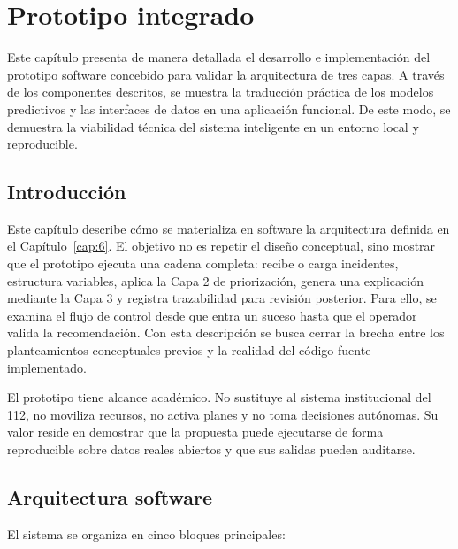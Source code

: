 \chapter{Prototipo integrado}
\label{cap:8}

Este capítulo presenta de manera detallada el desarrollo e implementación del prototipo software concebido para validar la arquitectura de tres capas. A través de los componentes descritos, se muestra la traducción práctica de los modelos predictivos y las interfaces de datos en una aplicación funcional. De este modo, se demuestra la viabilidad técnica del sistema inteligente en un entorno local y reproducible.

\section{Introducción}

Este capítulo describe cómo se materializa en software la arquitectura definida en el Capítulo~\ref{cap:6}. El objetivo no es repetir el diseño conceptual, sino mostrar que el prototipo ejecuta una cadena completa: recibe o carga incidentes, estructura variables, aplica la Capa 2 de priorización, genera una explicación mediante la Capa 3 y registra trazabilidad para revisión posterior. Para ello, se examina el flujo de control desde que entra un suceso hasta que el operador valida la recomendación. Con esta descripción se busca cerrar la brecha entre los planteamientos conceptuales previos y la realidad del código fuente implementado.

El prototipo tiene alcance académico. No sustituye al sistema institucional del 112, no moviliza recursos, no activa planes y no toma decisiones autónomas. Su valor reside en demostrar que la propuesta puede ejecutarse de forma reproducible sobre datos reales abiertos y que sus salidas pueden auditarse.

\section{Arquitectura software}

El sistema se organiza en cinco bloques principales:

